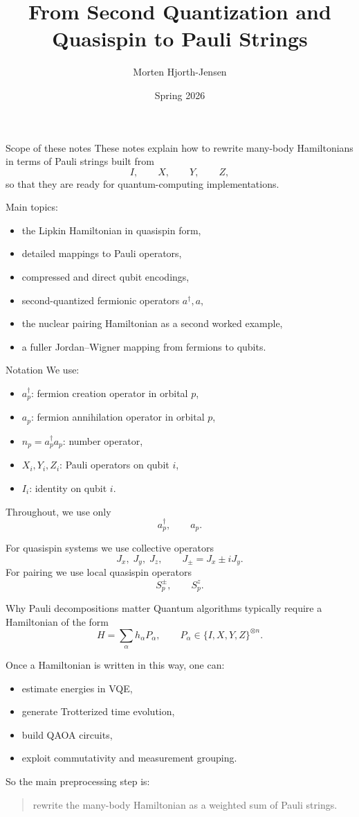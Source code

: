 \documentclass[aspectratio=169]{beamer}
\title{From Second Quantization and Quasispin to Pauli Strings}
\author{Morten Hjorth-Jensen}
\date{Spring 2026}
\begin{document}
\frame{\titlepage}

\begin{frame}{Scope of these notes}
These notes explain how to rewrite many-body Hamiltonians in terms of Pauli strings
built from
\[
I,\qquad X,\qquad Y,\qquad Z,
\]
so that they are ready for quantum-computing implementations.

\medskip

Main topics:
\begin{itemize}
\item the Lipkin Hamiltonian in quasispin form,
\item detailed mappings to Pauli operators,
\item compressed and direct qubit encodings,
\item second-quantized fermionic operators \(a^\dagger,a\),
\item the nuclear pairing Hamiltonian as a second worked example,
\item a fuller Jordan--Wigner mapping from fermions to qubits.
\end{itemize}
\end{frame}

\begin{frame}{Notation}
We use:
\begin{itemize}
\item \(a_p^\dagger\): fermion creation operator in orbital \(p\),
\item \(a_p\): fermion annihilation operator in orbital \(p\),
\item \(n_p=a_p^\dagger a_p\): number operator,
\item \(X_i,Y_i,Z_i\): Pauli operators on qubit \(i\),
\item \(I_i\): identity on qubit \(i\).
\end{itemize}

Throughout, we use only
\[
a_p^\dagger,\qquad a_p.
\]

For quasispin systems we use collective operators
\[
J_x,\; J_y,\; J_z,\qquad J_\pm = J_x \pm i J_y.
\]
For pairing we use local quasispin operators
\[
S_p^\pm,\qquad S_p^z.
\]
\end{frame}

\begin{frame}{Why Pauli decompositions matter}
Quantum algorithms typically require a Hamiltonian of the form
\[
H = \sum_\alpha h_\alpha P_\alpha,
\qquad
P_\alpha \in \{I,X,Y,Z\}^{\otimes n}.
\]

Once a Hamiltonian is written in this way, one can:
\begin{itemize}
\item estimate energies in VQE,
\item generate Trotterized time evolution,
\item build QAOA circuits,
\item exploit commutativity and measurement grouping.
\end{itemize}

So the main preprocessing step is:
\begin{quote}
rewrite the many-body Hamiltonian as a weighted sum of Pauli strings.
\end{quote}
\end{frame}
\end{document}
